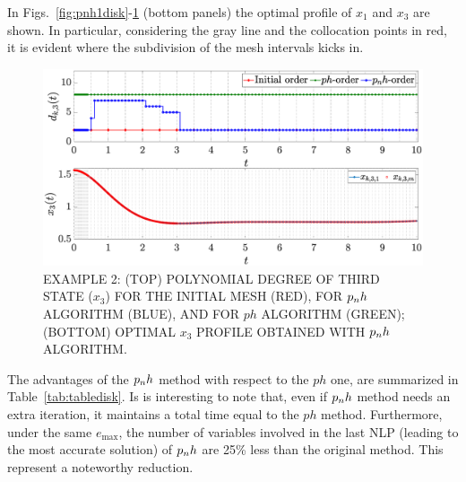In Figs.~\ref{fig:pnh1disk}-\ref{fig:pnh2disk} (bottom panels) the optimal profile of $x_1$ and $x_3$ are shown. In particular, considering the gray line and the collocation points in red, it is evident where the subdivision of the mesh intervals kicks in.
\begin{figure}[t]
	\centering
	\includegraphics[trim={1cm 0.1cm 2cm 1.05cm},clip,width=1.\columnwidth]{Img/pnh2_disk2}
	\caption{EXAMPLE 2: (TOP) POLYNOMIAL DEGREE OF THIRD STATE ($x_{3}$) FOR THE INITIAL MESH (RED), FOR $p_{n}h$ ALGORITHM (BLUE), AND FOR $ph$ ALGORITHM (GREEN); (BOTTOM)
	OPTIMAL $x_3$ PROFILE OBTAINED WITH $p_{n}h$ ALGORITHM.}
	\label{fig:pnh2disk}
\end{figure}
The advantages of the $p_{n}h$ method with respect to the $ph$ one, are summarized in Table~\ref{tab:tabledisk}. Is is interesting to note that, even if $p_{n}h$ method needs an extra iteration, it maintains a total time equal to the $ph$ method. Furthermore, under the same $e_{\max}$, the number of variables involved in the last NLP (leading to the most accurate solution) of $p_{n}h$ are 25\% less than the original method. This represent a noteworthy reduction.

